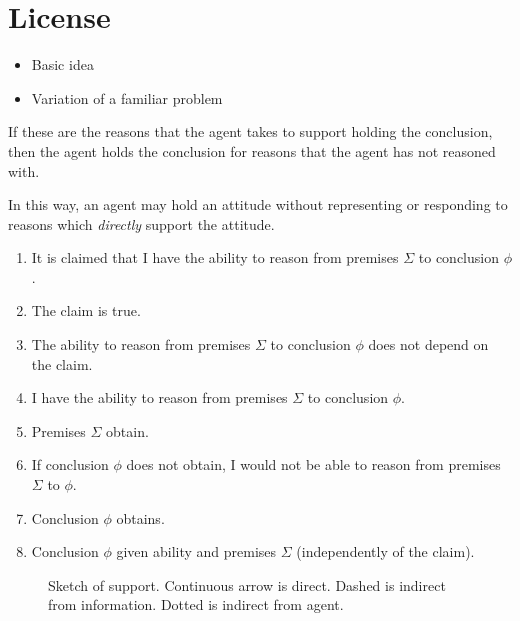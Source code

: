 \documentclass[10pt]{article}
\begin{document}
\section{License}
\label{sec:license}

\begin{note}[Overview]
  \begin{itemize}
  \item Basic idea
  \item Variation of a familiar problem
  \end{itemize}
\end{note}

\begin{note}
  If these are the reasons that the agent takes to support holding the conclusion, then the agent holds the conclusion for reasons that the agent has not reasoned with.

  {
    \color{red}
    In this way, an agent may hold an attitude without representing or responding to reasons which \emph{directly} support the attitude.
  }
\end{note}


\begin{enumerate}
\item It is claimed that I have the ability to reason from premises \(\Sigma\) to conclusion \(\phi\).
\item The claim is true.
\item The ability to reason from premises \(\Sigma\) to conclusion \(\phi\) does not depend on the claim.
\item I have the ability to reason from premises \(\Sigma\) to conclusion \(\phi\).
\item Premises \(\Sigma\) obtain.
\item If conclusion \(\phi\) does not obtain, I would not be able to reason from premises \(\Sigma\) to \(\phi\).
\item Conclusion \(\phi\) obtains.
\item Conclusion \(\phi\) given ability and premises \(\Sigma\) (independently of the claim).
\end{enumerate}

\begin{figure}[h]
  \centering
\caption{Sketch of support.
  Continuous arrow is direct.
  Dashed is indirect from information.
  Dotted is indirect from agent.}
\label{fig:dynamics}
\end{figure}
\end{document}
